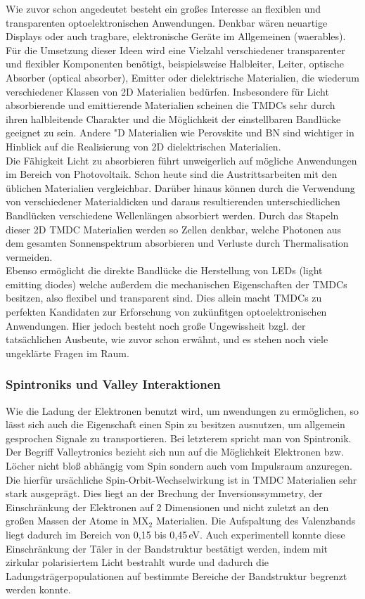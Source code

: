 Wie zuvor schon angedeutet besteht ein großes Interesse an flexiblen und transparenten optoelektronischen Anwendungen. Denkbar wären neuartige Displays oder auch tragbare, elektronische Geräte im Allgemeinen (waerables). Für die Umsetzung dieser Ideen wird eine Vielzahl verschiedener transparenter und flexibler Komponenten benötigt, beispielsweise Halbleiter, Leiter, optische Absorber (optical absorber), Emitter oder dielektrische Materialien, die wiederum verschiedener Klassen von 2D Materialien bedürfen. Insbesondere für Licht absorbierende und emittierende Materialien scheinen die TMDCs sehr durch ihren halbleitende Charakter und die Möglichkeit der einstellbaren Bandlücke geeignet zu sein. Andere "D Materialien wie Perovskite und BN sind wichtiger in Hinblick auf die Realisierung von 2D dielektrischen Materialien. \\ 

Die Fähigkeit Licht zu absorbieren führt unweigerlich auf mögliche Anwendungen im Bereich von Photovoltaik. Schon heute sind die Austrittsarbeiten mit den üblichen Materialien vergleichbar. Darüber hinaus können durch die Verwendung von \mos verschiedener Materialdicken und daraus resultierenden unterschiedlichen Bandlücken verschiedene Wellenlängen absorbiert werden. Durch das Stapeln dieser 2D TMDC Materialien werden so Zellen denkbar, welche Photonen aus dem gesamten Sonnenspektrum absorbieren und Verluste durch Thermalisation vermeiden. \\ 

Ebenso ermöglicht die direkte Bandlücke die Herstellung von LEDs (light emitting diodes) welche außerdem die mechanischen Eigenschaften der TMDCs besitzen, also flexibel und transparent sind. Dies allein macht TMDCs zu perfekten Kandidaten zur Erforschung von zukünfitgen optoelektronischen Anwendungen. Hier jedoch besteht noch große Ungewissheit bzgl. der tatsächlichen Ausbeute, wie zuvor schon erwähnt, und es stehen noch viele ungeklärte Fragen im Raum. \\

\subsubsection*{Spintroniks und Valley Interaktionen}
Wie die Ladung der Elektronen benutzt wird, um nwendungen zu ermöglichen, so lässt sich auch die Eigenschaft einen Spin zu besitzen ausnutzen, um allgemein gesprochen Signale zu transportieren. Bei letzterem spricht man von Spintronik. Der Begriff Valleytronics bezieht sich nun auf die Möglichkeit Elektronen bzw. Löcher nicht bloß abhängig vom Spin sondern auch vom Impulsraum anzuregen. Die hierfür ursächliche Spin-Orbit-Wechselwirkung ist in TMDC Materialien sehr stark ausgeprägt. Dies liegt an der Brechung der Inversionssymmetry, der Einschränkung der Elektronen auf 2 Dimensionen und nicht zuletzt an den großen Massen der Atome in MX$_2$ Materialien. Die Aufspaltung des Valenzbands liegt dadurch im Bereich von 0,15 bis 0,45\,eV. Auch experimentell konnte diese Einschränkung der Täler in der Bandstruktur bestätigt werden, indem \mos mit zirkular polarisiertem Licht bestrahlt wurde und dadurch die Ladungsträgerpopulationen auf bestimmte Bereiche der Bandstruktur begrenzt werden konnte.